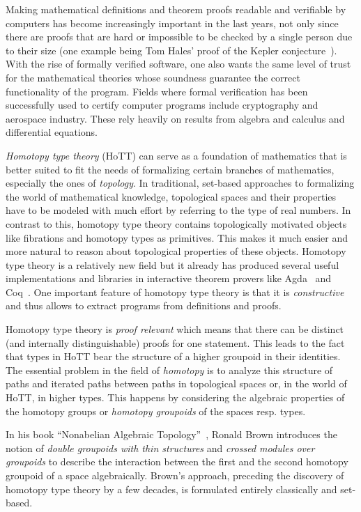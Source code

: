 Making mathematical definitions and theorem proofs readable and verifiable by
computers has become increasingly important in the last years, not only since there
are proofs that are hard or impossible to be checked by a single person due to their
size (one example being Tom Hales' proof of the Kepler conjecture~\cite{flyspeck}).
With the rise of formally verified software, one also wants the same level of trust
for the mathematical theories whose soundness guarantee the correct functionality
of the program.
Fields where formal verification has been successfully used to certify computer
programs include cryptography and aerospace industry.
These rely heavily on results from algebra and calculus and differential equations.

\emph{Homotopy type theory} (HoTT) can serve as a foundation of mathematics
that is better suited to fit the needs of formalizing certain branches of mathematics,
especially the ones of \emph{topology}.
In traditional, set-based approaches to formalizing the world
of mathematical knowledge, topological spaces and their properties
have to be modeled with much effort by referring to the type of real numbers.
In contrast to this, homotopy type theory contains topologically motivated objects
like fibrations and homotopy types as primitives.
This makes it much easier and more natural to reason about topological properties
of these objects.
Homotopy type theory is a relatively new field but it already has produced several
useful implementations and libraries in interactive theorem provers like
Agda~\cite{hott-agda} and Coq~\cite{hott-coq}.
One important feature of homotopy
type theory is that it is \emph{constructive} and thus allows to extract programs
from definitions and proofs.

Homotopy type theory is \emph{proof relevant} which means that there can be distinct
(and internally distinguishable) proofs for one statement.
This leads to the fact that types in HoTT bear the structure of a higher groupoid
in their identities.
The essential problem in the field of \emph{homotopy} is to analyze this structure
of paths and iterated paths between paths in topological spaces or,
in the world of HoTT, in higher types.
This happens by considering the algebraic properties of the homotopy groups or
\emph{homotopy groupoids} of the spaces resp. types.

In his book ``Nonabelian Algebraic Topology''~\cite{nat}, Ronald Brown
introduces the notion of \emph{double groupoids with thin structures} and
\emph{crossed modules over groupoids} to describe the interaction between
the first and the second homotopy groupoid of a space algebraically.
Brown's approach, preceding the discovery of homotopy type theory by a few
decades, is formulated entirely classically and set-based.


